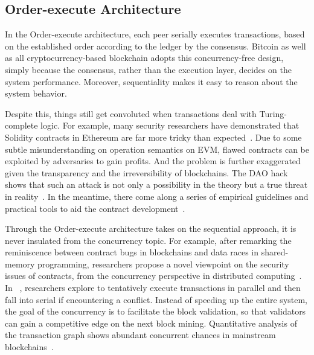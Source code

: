 \subsection{Order-execute Architecture}
\label{sec:literature:execution:order-execute}
In the Order-execute architecture, each peer serially executes transactions, based on the established order according to the ledger by the consensus. 
Bitcoin as well as all cryptocurrency-based blockchain adopts this concurrency-free design, simply because the consensus, rather than the execution layer, decides on the system performance. 
Moreover, sequentiality makes it easy to reason about the system behavior. 

Despite this, things still get convoluted when transactions deal with Turing-complete logic. For example, many security researchers have demonstrated that Solidity contracts in Ethereum are far more tricky than expected~\cite{luu2016making,parizi2018smart,atzei2017survey}. 
Due to some subtle misunderstanding on operation semantics on EVM, flawed contracts can be exploited by adversaries to gain profits. 
And the problem is further exaggerated given the transparency and the irreversibility of blockchains. 
The DAO hack shows that such an attack is not only a possibility in the theory but a true threat in reality~\cite{santos2018dao}.
In the meantime, there come along a series of empirical guidelines and practical tools to aid the contract development~\cite{ducasse2019open,jeng2019step,bai2018formal,tikhomirov2018smartcheck}. 

Through the Order-execute architecture takes on the sequential approach, it is never insulated from the concurrency topic. 
For example, after remarking the reminiscence between contract bugs in blockchains and data races in shared-memory programming, researchers propose a novel viewpoint on the security issues of contracts, from the concurrency perspective in distributed computing~\cite{herlihy2019blockchains,sergey2017concurrent}. 
In ~\cite{dickerson2019adding}, researchers explore to tentatively execute transactions in parallel and then fall into serial if encountering a conflict.  
Instead of speeding up the entire system, the goal of the concurrency is to facilitate the block validation, so that validators can gain a competitive edge on the next block mining. 
Quantitative analysis of the transaction graph shows abundant concurrent chances in mainstream blockchains~\cite{reijsbergen2020exploiting,saraph2019empirical}. 

